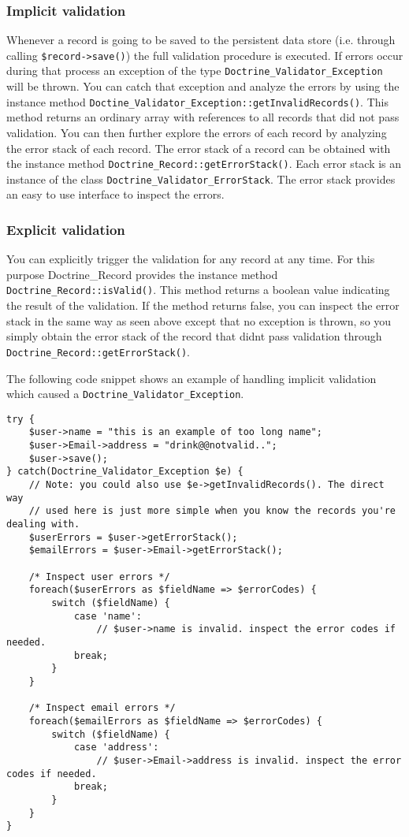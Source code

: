 \documentclass[11pt,a4paper]{report}
\begin{document}
\subsubsection{Implicit validation}
Whenever a record is going to be saved to the persistent data store (i.e. through calling \texttt{\$record->save()}) the full validation procedure is executed. If errors occur during that process an exception of the type \texttt{Doctrine\_Validator\_Exception} will be thrown. You can catch that exception and analyze the errors by using the instance method \texttt{Doctine\_Validator\_Exception::getInvalidRecords()}. This method returns an ordinary array with references to all records that did not pass validation. You can then further explore the errors of each record by analyzing the error stack of each record. The error stack of a record can be obtained with the instance method \texttt{Doctrine\_Record::getErrorStack()}. Each error stack is an instance of the class \texttt{Doctrine\_Validator\_ErrorStack}. The error stack provides an easy to use interface to inspect the errors.

\subsubsection{Explicit validation}
You can explicitly trigger the validation for any record at any time. For this purpose Doctrine\_Record provides the instance method \texttt{Doctrine\_Record::isValid()}. This method returns a boolean value indicating the result of the validation. If the method returns false, you can inspect the error stack in the same way as seen above except that no exception is thrown, so you simply obtain the error stack of the record that didnt pass validation through \texttt{Doctrine\_Record::getErrorStack()}.

The following code snippet shows an example of handling implicit validation which caused a \texttt{Doctrine\_Validator\_Exception}.

\begin{verbatim}
try {
    $user->name = "this is an example of too long name";
    $user->Email->address = "drink@@notvalid..";
    $user->save();
} catch(Doctrine_Validator_Exception $e) {
    // Note: you could also use $e->getInvalidRecords(). The direct way
    // used here is just more simple when you know the records you're dealing with.
    $userErrors = $user->getErrorStack();
    $emailErrors = $user->Email->getErrorStack();

    /* Inspect user errors */
    foreach($userErrors as $fieldName => $errorCodes) {
        switch ($fieldName) {
            case 'name':
                // $user->name is invalid. inspect the error codes if needed.
            break;
        }
    }

    /* Inspect email errors */
    foreach($emailErrors as $fieldName => $errorCodes) {
        switch ($fieldName) {
            case 'address':
                // $user->Email->address is invalid. inspect the error codes if needed.
            break;
        }
    }
}
\end{verbatim}
\end{document}
